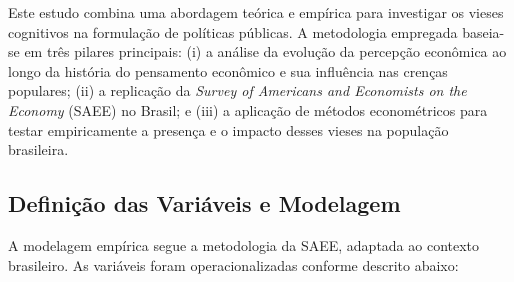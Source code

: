 Este estudo combina uma abordagem teórica e empírica para investigar os vieses cognitivos na formulação de políticas públicas. A metodologia empregada baseia-se em três pilares principais: 
(i) a análise da evolução da percepção econômica ao longo da história do pensamento econômico e sua influência nas crenças populares; 
(ii) a replicação da \textit{Survey of Americans and Economists on the Economy} (SAEE) no Brasil; e 
(iii) a aplicação de métodos econométricos para testar empiricamente a presença e o impacto desses vieses na população brasileira.

\subsection{Definição das Variáveis e Modelagem} %

A modelagem empírica segue a metodologia da SAEE, adaptada ao contexto brasileiro. As variáveis foram operacionalizadas conforme descrito abaixo:

\renewcommand{\arraystretch}{1.3}

